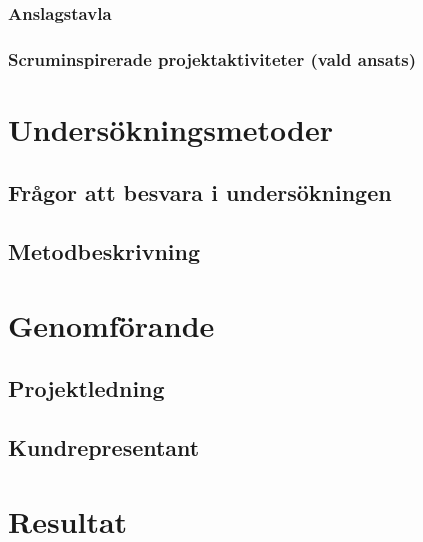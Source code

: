 \documentclass[conference]{IEEEtran}
\begin{document}
\subsubsection{Anslagstavla}

\subsubsection{Scruminspirerade projektaktiviteter (vald ansats)}




\section*{Undersökningsmetoder}

\subsection{Frågor att besvara i undersökningen}

\subsection{Metodbeskrivning}

\section{Genomförande}

\subsection{Projektledning}

\subsection{Kundrepresentant}

\section{Resultat}
\end{document}
